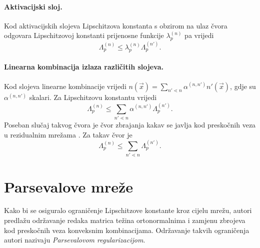 \documentclass[utf8, seminar, numeric, lmodern]{feri}
\begin{document}
\paragraph{Aktivacijski sloj.} Kod aktivacijskih slojeva Lipschitzova konstanta s obzirom na ulaz čvora odgovara Lipschitzovoj konstanti prijenosne funkcije $\lambda_p^{(n)}$ pa vrijedi
\begin{equation}
\Lambda_p^{(n)} \leq \lambda_p^{(n)}\Lambda_p^{(n')}.
\end{equation}

\paragraph{Linearna kombinacija izlaza različitih slojeva.} Kod slojeva linearne kombinacije vrijedi $n(\vec x) = \sum_{n'\lessdot n}\alpha^{(n,n')}n'(\vec x)$, gdje su $\alpha^{(n,n')}$ skalari. Za Lipschitzovu konstantu vrijedi
\begin{equation} \label{eq:linear-combination}
\Lambda_p^{(n)} \leq \sum_{n'\lessdot n}\alpha^{(n,n')}\Lambda_p^{(n')}.
\end{equation}
Poseban slučaj takvog čvora je čvor zbrajanja kakav se javlja kod preskočnih veza u rezidualnim mrežama \cite{he15-resnet}. Za takav čvor je
\begin{equation}
\Lambda_p^{(n)} \leq \sum_{n'\lessdot n}\Lambda_p^{(n')}.
\end{equation}


\section{Parsevalove mreže}

Kako bi se osiguralo ograničenje Lipschitzove konstante kroz cijelu mrežu, autori predlažu održavanje redaka matrica težina ortonormalnima i zamjenu zbrojeva kod preskočnih veza konveksnim kombinacijama. Održavanje takvih ograničenja autori nazivaju \emph{Parsevalovom regularizacijom}.
\end{document}
